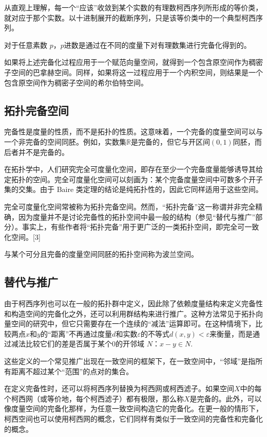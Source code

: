 从直观上理解，每一个“应该”收敛到某个实数的有理数柯西序列所形成的等价类，就对应于那个实数。以十进制展开的截断序列，只是该等价类中的一个典型柯西序列。

对于任意素数 $p$，$p$进数是通过在不同的度量下对有理数集进行完备化得到的。

如果将上述完备化过程应用于一个赋范向量空间，就得到一个包含原空间作为稠密子空间的巴拿赫空间。同样，如果将这一过程应用于一个内积空间，则结果是一个包含原空间作为稠密子空间的希尔伯特空间。
\subsection{拓扑完备空间}
完备性是度量的性质，而不是拓扑的性质。这意味着，一个完备的度量空间可以与一个非完备的空间同胚。例如，实数集$\mathbb{R}$是完备的，但它与开区间$(0,1)$同胚，而后者并不是完备的。

在拓扑学中，人们研究完全可度量化空间，即存在至少一个完备度量能够诱导其给定拓扑的空间。完全可度量化空间可以刻画为：某个完备度量空间中可数多个开子集的交集。由于 Baire 类定理的结论是纯拓扑性的，因此它同样适用于这些空间。

完全可度量化空间常被称为拓扑完备空间。然而，“拓扑完备”这一称谓并非完全精确，因为度量并不是讨论完备性的拓扑空间中最一般的结构（参见“替代与推广”部分）。事实上，有些作者将“拓扑完备”用于更广泛的一类拓扑空间，即完全可一致化空间。[3]

与某个可分且完备的度量空间同胚的拓扑空间称为波兰空间。
\subsection{替代与推广}
由于柯西序列也可以在一般的拓扑群中定义，因此除了依赖度量结构来定义完备性和构造空间的完备化之外，还可以利用群结构来进行推广。这种方法常见于拓扑向量空间的研究中，但它只需要存在一个连续的“减法”运算即可。在这种情境下，比较两点$x$和$y$的“距离”不再通过度量$d$和实数$\varepsilon$的不等式$d(x, y)<\varepsilon$来衡量，而是通过减法比较它们的差是否属于某个$0$的开邻域 $N$：$x - y \in N$.

这些定义的一个常见推广出现在一致空间的框架下，在一致空间中，“邻域”是指所有距离不超过某个“范围”的点对的集合。

在定义完备性时，还可以将柯西序列替换为柯西网或柯西滤子。如果空间$X$中的每个柯西网（或等价地，每个柯西滤子）都有极限，那么称$X$是完备的。此外，可以像度量空间的完备化那样，为任意一致空间构造它的完备化。在更一般的情形下，柯西空间也可以使用柯西网的概念，它们同样有类似于一致空间的完备性和完备化的概念。
